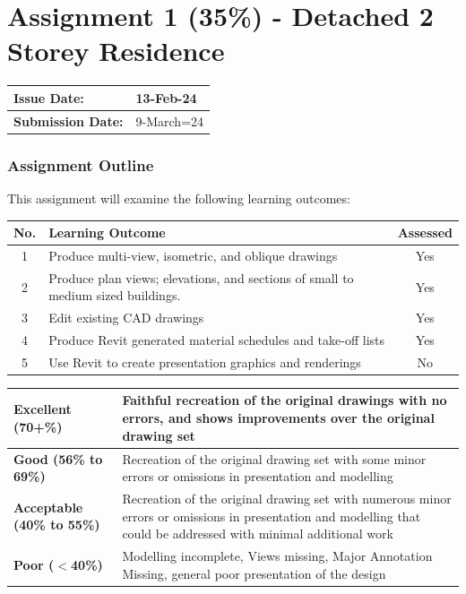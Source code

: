 
	
\part*{Assignment 1 (35\%) - Detached 2 Storey Residence}

\begin{tabularx}{\textwidth}{ |X|X| }
	\hline
	\textbf{Issue Date:} & 13-Feb-24 \\
	\hline 
	\textbf{Submission Date:}  & 9-March=24 \\
	\hline
\end{tabularx}


\section*{Assignment Outline}

This assignment will examine the following learning outcomes:\\

\begin{tabularx}{\textwidth}{ |c|X|c| }
	\hline
	\textbf{No.} & \textbf{Learning Outcome} & \textbf{Assessed} \\
	\hline 
	1  & Produce multi-view, isometric, and oblique drawings & Yes \\
	2  & Produce plan views; elevations, and sections of small to medium sized buildings. & Yes \\
	3  & Edit existing CAD drawings & Yes \\
	4  & Produce Revit generated material schedules and take-off lists & Yes \\
	5  & Use Revit to create presentation graphics and renderings & No \\
	\hline
\end{tabularx}


\vspace{1cm}

\begin{tabularx}{\textwidth}{ |l|X| }
	\hline 
	\textbf{Excellent (70+\%)} & Faithful recreation of the original drawings with no errors, and shows improvements over the original drawing set\\ 
	\hline
	\textbf{Good (56\% to 69\%)} & Recreation of the original drawing set with some minor errors or omissions in presentation and modelling \\
	\hline
	\textbf{Acceptable (40\% to 55\%)} & Recreation of the original drawing set with numerous minor errors or omissions in presentation and modelling that could be addressed with minimal additional work \\ 
	\hline
	\textbf{Poor ($<$40\%)} & Modelling incomplete, Views missing, Major Annotation Missing, general poor presentation of the design  \\
	\hline
\end{tabularx}

